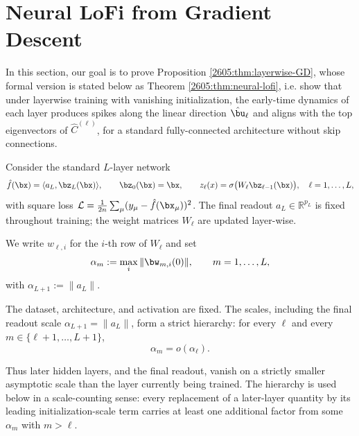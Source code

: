\section{Neural LoFi from Gradient Descent}

\label{2605:app:GD-neural}
In this section, our goal is to prove Proposition \ref{2605:thm:layerwise-GD}, whose formal version is stated below as Theorem \ref{2605:thm:neural-lofi}, i.e. show that under layerwise training with vanishing initialization, the early-time dynamics of each layer produces spikes along the linear direction $\hat{\bu}_\ell$ and aligns with the top eigenvectors of $\widehat{C}^{(\ell)}$, for a standard fully-connected architecture without skip connections.

Consider the standard $L$-layer network
\begin{equation}
\hat f(\bx)=\langle a_L, \bz_L(\bx)\rangle,
\qquad
\bz_0(\bx)=\bx,
\qquad
z_\ell(x)=\sigma \bigl(W_\ell \bz_{\ell-1}(\bx)\bigr),\quad \ell=1,\dots,L,
\label{2605:eq:sec2-arch}
\end{equation}
with square loss $\mathcal{L}=\tfrac{1}{2n}\sum_\mu(y_\mu-\hat f(\bx_\mu))^2$. The final readout $a_L\in\mathbb{R}^{p_L}$ is fixed throughout training; the weight matrices $W_\ell$ are updated layer-wise.




We write $w_{\ell,i}$ for the $i$-th row of $W_\ell$ and set
\begin{equation}\label{2605:eq:init-scales}
\alpha_m := \max_i \|\bw_{m,i}(0)\|, \qquad m=1,\dots,L,
\end{equation}
with  $\alpha_{L+1}:=\|a_L\|$. 

\begin{assumption}\label{2605:ass:scale-sep}
The dataset, architecture, and activation are fixed. The scales, including the
final readout scale \(\alpha_{L+1}=\|a_L\|\), form a strict hierarchy: for
every $\ell$ and every $m\in\{\ell+1,\dots,L+1\}$,
\begin{equation}\label{2605:eq:scale-hierarchy}
\alpha_m=o(\alpha_\ell).
\end{equation}
\end{assumption}

Thus later hidden layers, and the final readout, vanish on a strictly smaller
asymptotic scale than the layer currently being trained.  The hierarchy is used
below in a scale-counting sense: every replacement of a later-layer quantity by
its leading initialization-scale term carries at least one additional factor
from some \(\alpha_m\) with \(m>\ell\).

